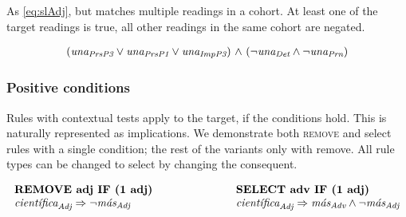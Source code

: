  As \ref{eq:slAdj}, but matches multiple readings in a cohort. At least one of the target readings is true, all other readings in the same cohort are negated.

\begin{equation}
\begin{array}{c @{~\wedge~} c}
(\unaPrsPThree  \vee \unaPrsPOne \vee \unaImp) & (\neg \unaDet \wedge \neg \unaPrn) \\
\end{array}
\label{eq:slVb}
\end{equation}


\subsubsection{Positive conditions} 

Rules with contextual tests apply to the target, if the conditions hold. 
This is naturally represented as implications. We demonstrate both \textsc{remove} and {\sc select} rules with a single condition; the rest of the variants only with {\sc remove}. All rule types can be changed to {\sc select} by changing the consequent.


\begin{equation}
\begin{array}{l @{\hspace{2.5cm}} l}
\text{\cgrule{REMOVE adj IF (1 adj)}}   &  \text{\cgrule{SELECT adv IF (1 adj)}} \\
\cientificaAdj \Rightarrow \neg{}\masAdj &  \cientificaAdj \Rightarrow \masAdv \wedge \neg{}\masAdj \\
\end{array}
\end{equation}

